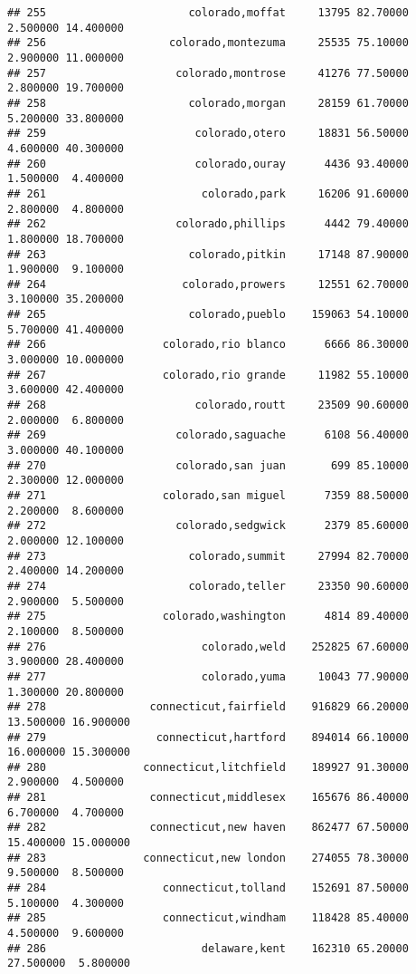 \documentclass[
]{article}
\begin{document}
\begin{verbatim}
## 255                      colorado,moffat     13795 82.70000  2.500000 14.400000
## 256                   colorado,montezuma     25535 75.10000  2.900000 11.000000
## 257                    colorado,montrose     41276 77.50000  2.800000 19.700000
## 258                      colorado,morgan     28159 61.70000  5.200000 33.800000
## 259                       colorado,otero     18831 56.50000  4.600000 40.300000
## 260                       colorado,ouray      4436 93.40000  1.500000  4.400000
## 261                        colorado,park     16206 91.60000  2.800000  4.800000
## 262                    colorado,phillips      4442 79.40000  1.800000 18.700000
## 263                      colorado,pitkin     17148 87.90000  1.900000  9.100000
## 264                     colorado,prowers     12551 62.70000  3.100000 35.200000
## 265                      colorado,pueblo    159063 54.10000  5.700000 41.400000
## 266                  colorado,rio blanco      6666 86.30000  3.000000 10.000000
## 267                  colorado,rio grande     11982 55.10000  3.600000 42.400000
## 268                       colorado,routt     23509 90.60000  2.000000  6.800000
## 269                    colorado,saguache      6108 56.40000  3.000000 40.100000
## 270                    colorado,san juan       699 85.10000  2.300000 12.000000
## 271                  colorado,san miguel      7359 88.50000  2.200000  8.600000
## 272                    colorado,sedgwick      2379 85.60000  2.000000 12.100000
## 273                      colorado,summit     27994 82.70000  2.400000 14.200000
## 274                      colorado,teller     23350 90.60000  2.900000  5.500000
## 275                  colorado,washington      4814 89.40000  2.100000  8.500000
## 276                        colorado,weld    252825 67.60000  3.900000 28.400000
## 277                        colorado,yuma     10043 77.90000  1.300000 20.800000
## 278                connecticut,fairfield    916829 66.20000 13.500000 16.900000
## 279                 connecticut,hartford    894014 66.10000 16.000000 15.300000
## 280               connecticut,litchfield    189927 91.30000  2.900000  4.500000
## 281                connecticut,middlesex    165676 86.40000  6.700000  4.700000
## 282                connecticut,new haven    862477 67.50000 15.400000 15.000000
## 283               connecticut,new london    274055 78.30000  9.500000  8.500000
## 284                  connecticut,tolland    152691 87.50000  5.100000  4.300000
## 285                  connecticut,windham    118428 85.40000  4.500000  9.600000
## 286                        delaware,kent    162310 65.20000 27.500000  5.800000

\end{verbatim}
\end{document}
